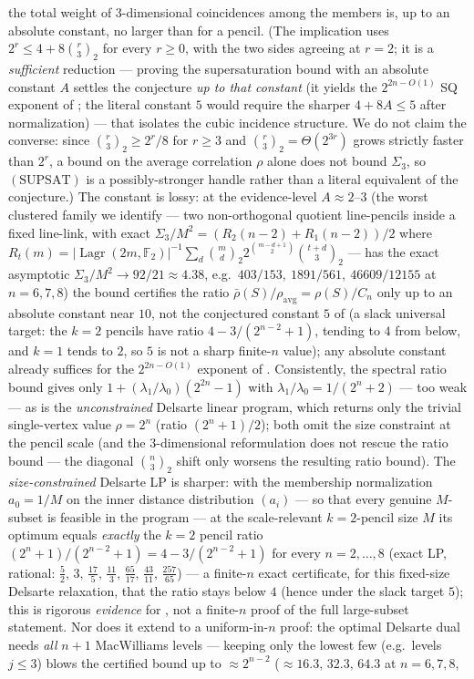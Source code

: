 \documentclass[11pt,a4paper]{article}
\theoremstyle{plain}
\theoremstyle{definition}
\newcommand{\F}{\mathbb{F}}
\DeclareMathOperator{\Lagr}{Lagr}
\begin{document}
the total weight of $3$-dimensional coincidences among the members is, up to an absolute constant, no larger than for a pencil. (The implication uses $2^r \le 4 + 8\binom{r}{3}_2$ for every $r \ge 0$, with the two sides agreeing at $r = 2$; it is a \emph{sufficient} reduction --- proving the supersaturation bound with an absolute constant $A$ settles the conjecture \emph{up to that constant} (it yields the $2^{2n-O(1)}$ SQ exponent of ; the literal constant $5$ would require the sharper $4+8A\le 5$ after normalization) --- that isolates the cubic incidence structure. We do not claim the converse: since $\binom{r}{3}_2 \ge 2^r/8$ for $r \ge 3$ and $\binom{r}{3}_2 = \Theta(2^{3r})$ grows strictly faster than $2^r$, a bound on the average correlation $\rho$ alone does not bound $\Sigma_3$, so $(\mathrm{SUPSAT})$ is a possibly-stronger handle rather than a literal equivalent of the conjecture.) The constant is lossy: at the evidence-level $A \approx 2$--$3$ (the worst clustered family we identify --- two non-orthogonal quotient line-pencils inside a fixed line-link, with exact $\Sigma_3/M^2 = (R_2(n{-}2)+R_1(n{-}2))/2$ where $R_t(m) = |\Lagr(2m,\F_2)|^{-1}\sum_{d} \binom{m}{d}_2 2^{\binom{m-d+1}{2}} \binom{t+d}{3}_2$ --- has the exact asymptotic $\Sigma_3/M^2 \to 92/21 \approx 4.38$, e.g.\ $403/153,\ 1891/561,\ 46609/12155$ at $n=6,7,8$) the bound certifies the ratio $\bar\rho(S)/\rho_{\mathrm{avg}} = \rho(S)/C_n$ only up to an absolute constant near $10$, not the conjectured constant $5$ of  (a slack universal target: the $k=2$ pencils have ratio $4-3/(2^{n-2}+1)$, tending to $4$ from below, and $k=1$ tends to $2$, so $5$ is not a sharp finite-$n$ value); any absolute constant already suffices for the $2^{2n-O(1)}$ exponent of . Consistently, the spectral ratio bound gives only $1 + (\lambda_1/\lambda_0)(2^{2n}-1)$ with $\lambda_1/\lambda_0 = 1/(2^n+2)$ --- too weak --- as is the \emph{unconstrained} Delsarte linear program, which returns only the trivial single-vertex value $\rho = 2^n$ (ratio $(2^n+1)/2$); both omit the size constraint at the pencil scale (and the $3$-dimensional reformulation does not rescue the ratio bound --- the diagonal $\binom{n}{3}_2$ shift only worsens the resulting ratio bound). The \emph{size-constrained} Delsarte LP is sharper: with the membership normalization $a_0 = 1/M$ on the inner distance distribution $(a_i)$ --- so that every genuine $M$-subset is feasible in the program --- at the scale-relevant $k=2$-pencil size $M$ its optimum equals \emph{exactly} the $k=2$ pencil ratio $(2^n+1)/(2^{n-2}+1) = 4 - 3/(2^{n-2}+1)$ for every $n = 2,\dots,8$ (exact LP, rational: $\tfrac52,\,3,\,\tfrac{17}5,\,\tfrac{11}3,\,\tfrac{65}{17},\,\tfrac{43}{11},\,\tfrac{257}{65}$) --- a finite-$n$ exact certificate, for this fixed-size Delsarte relaxation, that the ratio stays below $4$ (hence under the slack target $5$); this is rigorous \emph{evidence} for , not a finite-$n$ proof of the full large-subset statement. Nor does it extend to a uniform-in-$n$ proof: the optimal Delsarte dual needs \emph{all} $n+1$ MacWilliams levels --- keeping only the lowest few (e.g.\ levels $j \le 3$) blows the certified bound up to $\approx 2^{n-2}$ ($\approx 16.3,\,32.3,\,64.3$ at $n = 6,7,8$, 
\end{document}
